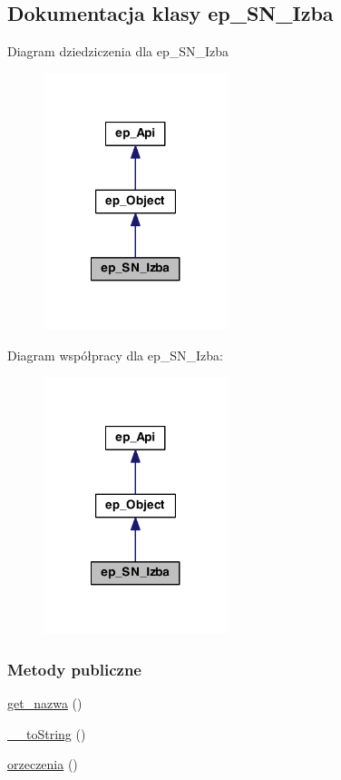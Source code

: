 \hypertarget{classep___s_n___izba}{\subsection{Dokumentacja klasy ep\-\_\-\-S\-N\-\_\-\-Izba}
\label{classep___s_n___izba}
}


Diagram dziedziczenia dla ep\-\_\-\-S\-N\-\_\-\-Izba\nopagebreak
\begin{figure}[H]
\begin{center}
\leavevmode
\includegraphics[width=152pt]{classep___s_n___izba__inherit__graph}
\end{center}
\end{figure}


Diagram współpracy dla ep\-\_\-\-S\-N\-\_\-\-Izba\-:\nopagebreak
\begin{figure}[H]
\begin{center}
\leavevmode
\includegraphics[width=152pt]{classep___s_n___izba__coll__graph}
\end{center}
\end{figure}
\subsubsection*{Metody publiczne}
\begin{DoxyCompactItemize}
\item 
\hyperlink{classep___s_n___izba_ac0818f0049d7b84f08f77128f54cee36}{get\-\_\-nazwa} ()
\item 
\hyperlink{classep___s_n___izba_a7516ca30af0db3cdbf9a7739b48ce91d}{\-\_\-\-\_\-to\-String} ()
\item 
\hyperlink{classep___s_n___izba_afafcff5d2bf7a4b4dd56b1a0a7c6a275}{orzeczenia} ()
\end{DoxyCompactItemize}
